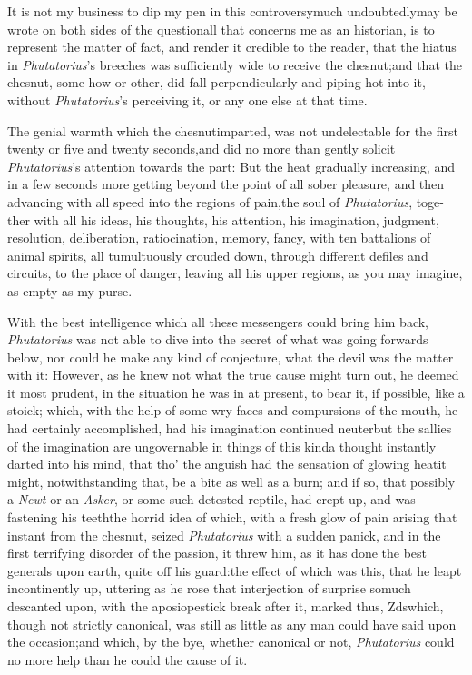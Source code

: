 \documentclass{article}
\begin{document}
It is not my business to dip my pen in this
controversy\tsh much undoubtedly\pb may be wrote on both
sides of the question\tsk all that concerns me as an historian,
is to represent the matter of fact, and render it credible to the
reader, that the hiatus in \textit{Phutatorius}’s breeches was
sufficiently wide to receive the ches\-nut;\break\tsh and that the
chesnut, some how or other, did fall perpendicularly and piping hot
into it, without \textit{Phutatorius}’s perceiving it, or any
one else at that time.

The genial warmth which the chesnut\break imparted, was not
undelectable for the first twenty or five and twenty
seconds,\tsk and did no more than gently solicit
\textit{Phutatorius}’s attention towards the
part:\tsk\break
But the heat gradually increasing, and in a few
seconds more getting beyond the point of all sober pleasure, and
then advancing with all speed into the regions of pain,\tsk the soul of
\textit{Phutatorius}, toge-\pb ther with all his ideas, his thoughts, his
attention, his imagination, judgment, resolution, deliberation,
ratiocination, memory, fancy, with ten battalions of animal
spirits, all tumultuously crouded down, through different defiles
and circuits, to the place of danger, leaving all his upper
regions, as you may imagine, as empty as my purse.

With the best intelligence which all these messengers could
bring him back, \textit{Phutatorius} was not able to dive into the
secret of what was going forwards below, nor could he make any kind
of conjecture, what the devil was the matter with it: However, as
he knew not what the true cause might turn out, he deemed it most
prudent, in the situation he was in at present, to bear it,
if possible, like a stoick;
which, with the help of some\pb
wry faces and compursions of the
mouth, he had certainly accomplished, had his imagination continued
neuter\tsh but the sallies of the imagination are
ungovernable in things of this kind\tsk a thought instantly
darted into his mind, that tho’ the anguish had the sensation
of glowing heat\tsk it might, notwithstanding that, be a bite as
well as a burn; and if so, that possibly a \textit{Newt} or an
\textit{Asker}, or some such detested reptile, had crept up, and was
fastening his teeth\tsh the horrid idea of which, with a
fresh glow of pain arising that instant from the chesnut, seized
\textit{Phutatorius} with a sudden panick, and in the first
terrifying disorder of the passion, it threw him, as it has done
the best generals upon earth, quite off his guard:\tsk the
effect of which was this, that he leapt incontinently up, uttering
as he rose that interjection of surprise so\pb much descanted upon,
with the apo\-sio\-pestick break after it, marked thus,\break
Z\tsh ds\tsk which, though not strictly canonical, was still as little as any man
could have said upon the occasion;\tsh\break and which,
by the bye, whether canonical or not, \textit{Phutatorius} could no
more help than he could the cause of it.
\end{document}
